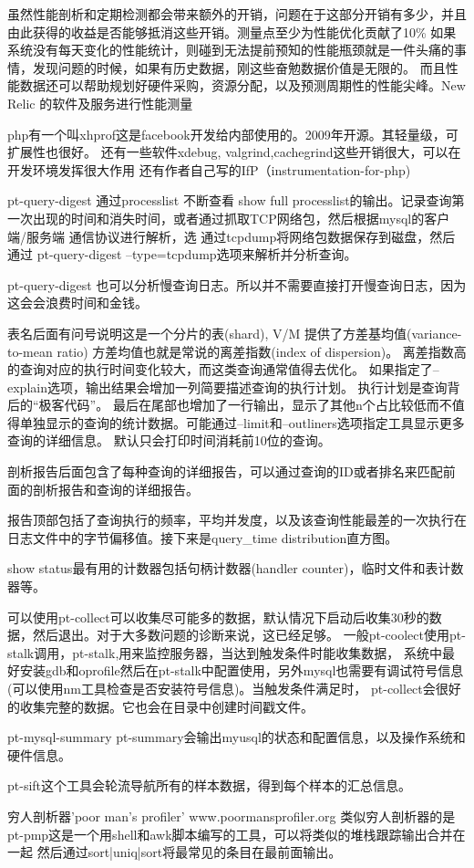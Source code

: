 虽然性能剖析和定期检测都会带来额外的开销，问题在于这部分开销有多少，并且由此获得的收益是否能够抵消这些开销。测量点至少为性能优化贡献了10\%
如果系统没有每天变化的性能统计，则碰到无法提前预知的性能瓶颈就是一件头痛的事情，发现问题的时候，如果有历史数据，刚这些奋勉数据价值是无限的。
而且性能数据还可以帮助规划好硬件采购，资源分配，以及预测周期性的性能尖峰。New Relic 的软件及服务进行性能测量

php有一个叫xhprof这是facebook开发给内部使用的。2009年开源。其轻量级，可扩展性也很好。
还有一些软件xdebug, valgrind,cachegrind这些开销很大，可以在开发环境发挥很大作用
还有作者自己写的IfP（instrumentation-for-php)

pt-query-digest 通过processlist 不断查看 show full processlist的输出。记录查询第一次出现的时间和消失时间，或者通过抓取TCP网络包，然后根据mysql的客户端/服务端
通信协议进行解析，选 通过tcpdump将网络包数据保存到磁盘，然后通过 pt-query-digest --type=tcpdump选项来解析并分析查询。

pt-query-digest 也可以分析慢查询日志。所以并不需要直接打开慢查询日志，因为这会会浪费时间和金钱。

表名后面有问号说明这是一个分片的表(shard), V/M 提供了方差基均值(variance-to-mean ratio) 方差均值也就是常说的离差指数(index of dispersion)。
离差指数高的查询对应的执行时间变化较大，而这类查询通常值得去优化。  如果指定了--explain选项，输出结果会增加一列简要描述查询的执行计划。
执行计划是查询背后的“极客代码”。
最后在尾部也增加了一行输出，显示了其他n个占比较低而不值得单独显示的查询的统计数据。可能通过--limit和--outliners选项指定工具显示更多查询的详细信息。
默认只会打印时间消耗前10位的查询。

剖析报告后面包含了每种查询的详细报告，可以通过查询的ID或者排名来匹配前面的剖析报告和查询的详细报告。

报告顶部包括了查询执行的频率，平均并发度，以及该查询性能最差的一次执行在日志文件中的字节偏移值。接下来是query_time distribution直方图。

show status最有用的计数器包括句柄计数器(handler counter)，临时文件和表计数器等。

可以使用pt-collect可以收集尽可能多的数据，默认情况下启动后收集30秒的数据，然后退出。对于大多数问题的诊断来说，这已经足够。
一般pt-coolect使用pt-stalk调用，pt-stalk,用来监控服务器，当达到触发条件时能收集数据，
系统中最好安装gdb和oprofile然后在pt-stalk中配置使用，另外mysql也需要有调试符号信息(可以使用nm工具检查是否安装符号信息)。当触发条件满足时，
pt-collect会很好的收集完整的数据。它也会在目录中创建时间戳文件。

pt-mysql-summary pt-summary会输出myusql的状态和配置信息，以及操作系统和硬件信息。

pt-sift这个工具会轮流导航所有的样本数据，得到每个样本的汇总信息。

穷人剖析器'poor man's profiler' www.poormansprofiler.org 类似穷人剖析器的是pt-pmp这是一个用shell和awk脚本编写的工具，可以将类似的堆栈跟踪输出合并在一起
然后通过sort|uniq|sort将最常见的条目在最前面输出。


